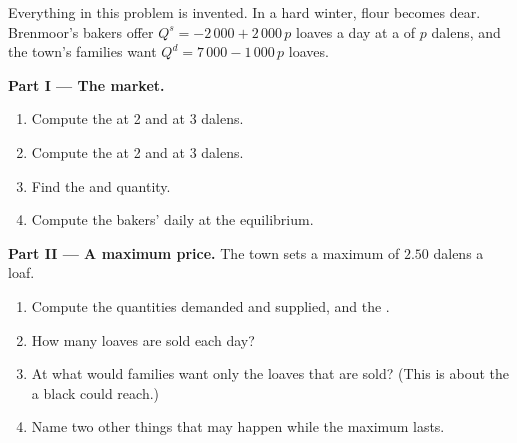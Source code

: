 \begin{problem}
\label{pb:g9:price-controls-taxes-subsidies:1}
Everything in this problem is invented. In a hard winter, flour becomes dear. Brenmoor's bakers offer
$Q^s = -2\,000 + 2\,000\,p$ loaves a day at a  of $p$ dalens, and the town's families want
$Q^d = 7\,000 - 1\,000\,p$ loaves.

\medskip
\noindent\textbf{Part I --- The market.}
\begin{enumerate}
  \item Compute the  at 2 and at 3 dalens.
  \item Compute the  at 2 and at 3 dalens.
  \item Find the  and quantity.
  \item Compute the bakers' daily  at the equilibrium.
\end{enumerate}

\medskip
\noindent\textbf{Part II --- A maximum price.} The town sets a maximum  of $2.50$ dalens a loaf.
\begin{enumerate}[resume]
  \item Compute the quantities demanded and supplied, and the .
  \item How many loaves are sold each day?
  \item At what  would families want only the loaves that are sold? (This is about the  a
        black  could reach.)
  \item Name two other things that may happen while the maximum  lasts.
\end{enumerate}


\end{problem}
